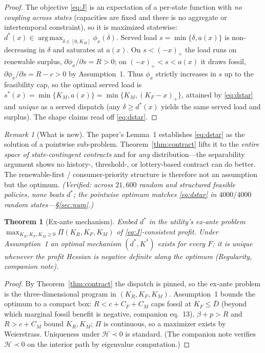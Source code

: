 \documentclass[11pt,reqno]{amsart}
\theoremstyle{plain}
\newtheorem{theorem}{Theorem}
\theoremstyle{definition}
\theoremstyle{remark}
\newtheorem{remark}{Remark}
\newcommand{\KR}{K_R}\newcommand{\KF}{K_F}\newcommand{\KM}{K_M}
\newcommand{\Dbar}{\bar D}
\newcommand{\CM}{C_M}\newcommand{\CF}{C_F}\newcommand{\CR}{C_R}
\newcommand{\bp}{\beta+p}
\DeclareMathOperator*{\argmax}{arg\,max}
\newcommand{\dstar}{d^{*}}
\begin{document}
\begin{proof}
The objective \eqref{eq:J} is an expectation of a per-state function with \emph{no
coupling across states} (capacities are fixed and there is no aggregate or
intertemporal constraint), so it is maximized statewise:
$\dstar(x)\in\argmax_{\delta\in[0,\KM]}\phi_x(\delta)$. Served load
$s=\min\{\delta,a(x)\}$ is non-decreasing in $\delta$ and saturates at $a(x)$. On
$s<(-x)_+$ the load runs on renewable surplus, $\partial\phi_x/\partial s=R>0$; on
$(-x)_+<s<a(x)$ it draws fossil, $\partial\phi_x/\partial s=R-c>0$ by
Assumption~1. Thus $\phi_x$ strictly increases in $s$ up to the feasibility cap,
so the optimal served load is $s^{*}(x)=\min\{\KM,a(x)\}=\min\{\KM,(\KF-x)_+\}$,
attained by \eqref{eq:dstar} and \emph{unique} as a served dispatch (any
$\delta\ge\dstar(x)$ yields the same served load and surplus). The shape claims
read off \eqref{eq:dstar}.
\end{proof}

\begin{remark}[What is new]
The paper's Lemma~1 establishes \eqref{eq:dstar} as the solution of a pointwise
sub-problem. Theorem~\ref{thm:contract} lifts it to the \emph{entire space of
state-contingent contracts} and for \emph{any} distribution---the separability
argument shows no history-, threshold-, or lottery-based contract can do better.
The renewable-first / consumer-priority structure is therefore not an assumption
but the optimum. \emph{(Verified: across $21{,}600$ random and structured feasible
policies, none beats $\dstar$; the pointwise optimum matches \eqref{eq:dstar} in
$4000/4000$ random states---\S\ref{sec:num}.)}
\end{remark}

\begin{theorem}[Ex-ante mechanism]\label{thm:exante}
Embed $\dstar$ in the utility's ex-ante problem
$\max_{\KR,\KF,\KM\ge0}\Pi(\KR,\KF,\KM)$ of \eqref{eq:J}-consistent profit. Under
Assumption~1 an optimal mechanism $(\dstar,K^{*})$ exists for every $F$; it is
unique whenever the profit Hessian is negative definite along the optimum
(Regularity, companion note).
\end{theorem}

\begin{proof}
By Theorem~\ref{thm:contract} the dispatch is pinned, so the ex-ante problem is
the three-dimensional program in $(\KR,\KF,\KM)$. Assumption~1 bounds the optimum
to a compact box: $R<c+\CF+\CM$ caps fossil at $\KF\le\Dbar$ (beyond which
marginal fossil benefit is negative, companion eq.\ 13), $\bp>R$ and $R>c+\CM$
bound $\KR,\KM$; $\Pi$ is continuous, so a maximizer exists by Weierstrass.
Uniqueness under $\mathcal H\prec0$ is standard. (The companion note verifies
$\mathcal H\prec0$ on the interior path by eigenvalue computation.)
\end{proof}
\end{document}
